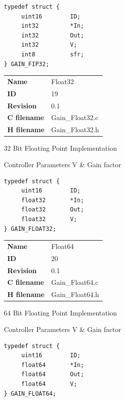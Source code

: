 \begin{lstlisting}
typedef struct {
     uint16        ID;
     int32         *In;
     int32         Out;
     int32         V;
     int8          sfr;
} GAIN_FIP32;
\end{lstlisting}

\ifdefined \AddTestReports
{}
\fi
{}
\nopagebreak[0]
\begin{tabular}{l l}
\textbf{Name} & Float32 \tabularnewline
\textbf{ID} & 19 \tabularnewline
\textbf{Revision} & 0.1 \tabularnewline
\textbf{C filename} & Gain\_Float32.c \tabularnewline
\textbf{H filename} & Gain\_Float32.h \tabularnewline
\end{tabular}
\vspace{1ex}

32 Bit Floating Point Implementation

\begin{XtoCtabular}{Controller Parameters}
V & Gain factor\tabularnewline
\hline
\end{XtoCtabular}

\begin{lstlisting}
typedef struct {
     uint16        ID;
     float32       *In;
     float32       Out;
     float32       V;
} GAIN_FLOAT32;
\end{lstlisting}

\ifdefined \AddTestReports
{}
\fi
{}
\nopagebreak[0]
\begin{tabular}{l l}
\textbf{Name} & Float64 \tabularnewline
\textbf{ID} & 20 \tabularnewline
\textbf{Revision} & 0.1 \tabularnewline
\textbf{C filename} & Gain\_Float64.c \tabularnewline
\textbf{H filename} & Gain\_Float64.h \tabularnewline
\end{tabular}
\vspace{1ex}

64 Bit Floating Point Implementation

\begin{XtoCtabular}{Controller Parameters}
V & Gain factor\tabularnewline
\hline
\end{XtoCtabular}

\begin{lstlisting}
typedef struct {
     uint16        ID;
     float64       *In;
     float64       Out;
     float64       V;
} GAIN_FLOAT64;
\end{lstlisting}

\ifdefined \AddTestReports
{}
\fi
